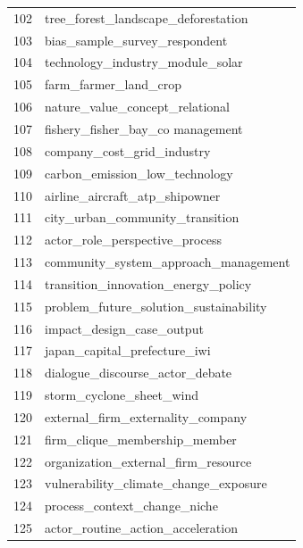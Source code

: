 \documentclass[12pt]{article}
\begin{document}
\begin{landscape}
\begin{figure}[htbp]
\begin{minipage}{0.15\textwidth}
\begin{tabular}{rl}
          102 &                tree\_forest\_landscape\_deforestation \\
          103 &                      bias\_sample\_survey\_respondent \\
          104 &                   technology\_industry\_module\_solar \\
          105 &                              farm\_farmer\_land\_crop \\
          106 &                    nature\_value\_concept\_relational \\
          107 &                   fishery\_fisher\_bay\_co management \\
          108 &                         company\_cost\_grid\_industry \\
          109 &                     carbon\_emission\_low\_technology \\
          110 &                     airline\_aircraft\_atp\_shipowner \\
          111 &                    city\_urban\_community\_transition \\
          112 &                     actor\_role\_perspective\_process \\
          113 &               community\_system\_approach\_management \\
          114 &                transition\_innovation\_energy\_policy \\
          115 &             problem\_future\_solution\_sustainability \\
          116 &                          impact\_design\_case\_output \\
          117 &                       japan\_capital\_prefecture\_iwi \\
          118 &                    dialogue\_discourse\_actor\_debate \\
          119 &                           storm\_cyclone\_sheet\_wind \\
          120 &                  external\_firm\_externality\_company \\
          121 &                      firm\_clique\_membership\_member \\
          122 &                organization\_external\_firm\_resource \\
          123 &              vulnerability\_climate\_change\_exposure \\
          124 &                       process\_context\_change\_niche \\
          125 &                  actor\_routine\_action\_acceleration \\

\end{tabular}
\end{minipage}
\end{figure}
\end{landscape}
\end{document}
